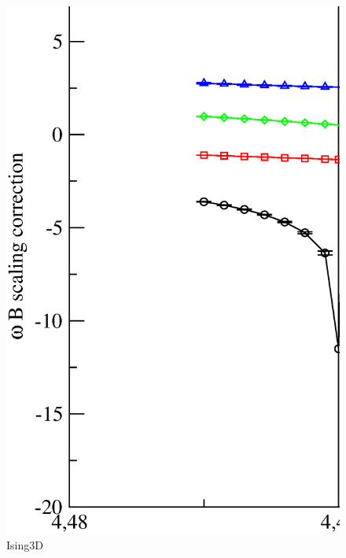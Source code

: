 \begin{figure}[!htpb]
  \centering
  \includegraphics[width=15cm]{./plots/Ising3D/Ising3D_omega_from_B_vs_Temperature.eps}
  \caption{Ising3D}
\end{figure}

